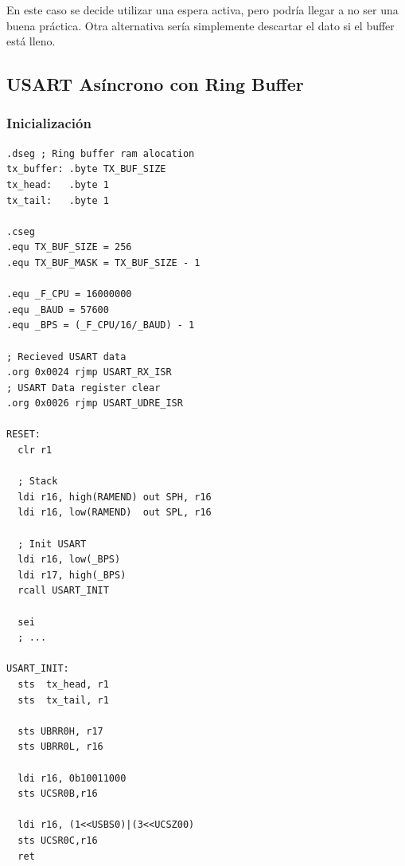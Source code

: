 En este caso se decide utilizar una espera activa, pero podría llegar a no ser una buena práctica. Otra alternativa sería simplemente descartar el dato si el buffer está lleno.

    
\subsection{USART Asíncrono con Ring Buffer}\label{anexo:USART_Asincrono_con_Ring_Buffer}

  \subsubsection{Inicialización}
  \begin{verbatim}
.dseg ; Ring buffer ram alocation
tx_buffer: .byte TX_BUF_SIZE  
tx_head:   .byte 1            
tx_tail:   .byte 1           

.cseg
.equ TX_BUF_SIZE = 256
.equ TX_BUF_MASK = TX_BUF_SIZE - 1

.equ _F_CPU = 16000000
.equ _BAUD = 57600 
.equ _BPS = (_F_CPU/16/_BAUD) - 1

; Recieved USART data
.org 0x0024 rjmp USART_RX_ISR	
; USART Data register clear
.org 0x0026 rjmp USART_UDRE_ISR 

RESET:
  clr r1

  ; Stack 
  ldi r16, high(RAMEND) out SPH, r16
  ldi r16, low(RAMEND)  out SPL, r16

  ; Init USART
  ldi r16, low(_BPS)
  ldi r17, high(_BPS)
  rcall USART_INIT

  sei
  ; ...

USART_INIT:	
  sts  tx_head, r1
  sts  tx_tail, r1

  sts UBRR0H, r17
  sts UBRR0L, r16

  ldi r16, 0b10011000
  sts UCSR0B,r16

  ldi r16, (1<<USBS0)|(3<<UCSZ00)
  sts UCSR0C,r16
  ret
    \end{verbatim}
